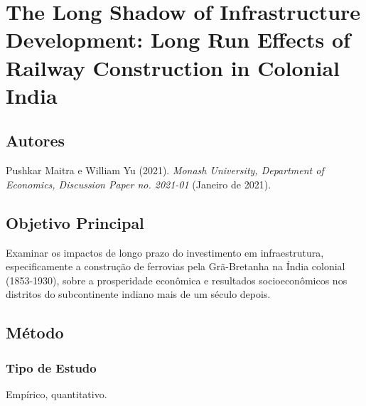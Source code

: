 \documentclass[12pt]{article}
\begin{document}
\newpage

\section{The Long Shadow of Infrastructure Development: Long Run Effects of Railway Construction in Colonial India}

\subsection*{Autores}
Pushkar Maitra e William Yu (2021). \textit{Monash University, Department of Economics, Discussion Paper no. 2021-01} (Janeiro de 2021).

\subsection*{Objetivo Principal}
Examinar os impactos de longo prazo do investimento em infraestrutura, especificamente a construção de ferrovias pela Grã-Bretanha na Índia colonial (1853-1930), sobre a prosperidade econômica e resultados socioeconômicos nos distritos do subcontinente indiano mais de um século depois.

\subsection*{Método}

\subsubsection*{Tipo de Estudo}
Empírico, quantitativo.
\end{document}
